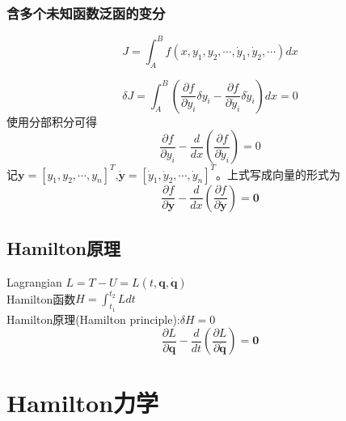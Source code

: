 \documentclass[12pt]{article}
\numberwithin{equation}{section}
\begin{document}
        \subsubsection{含多个未知函数泛函的变分}
        \begin{equation}
            J=\int_A^Bf(x,y_1,y_2,\cdots,\dot{y}_1,\dot{y}_2,\cdots)dx
        \end{equation}

        \begin{equation*}
            \delta J=\int_A^B\left(\frac{\partial f}{\partial y_i}\delta y_i-\frac{\partial f}{\partial \dot{y}_i}\delta \dot{y}_i\right)dx=0
        \end{equation*}
        使用分部积分可得
        \begin{equation}\label{mE-L}
            \frac{\partial f}{\partial y_i}-\frac{d}{dx}\left(\frac{\partial f}{\partial \dot{y}_i}\right)=0
        \end{equation}
        记$\mathbf{y}=[y_1,y_2,\cdots,y_n]^T$,$\dot{\mathbf{y}}=[\dot{y}_1,\dot{y}_2,\cdots,\dot{y}_n]^T$。上式写成向量的形式为
        \begin{equation}\label{vE-L}
            \frac{\partial f}{\partial \mathbf{y}}-\frac{d}{dx}\left(\frac{\partial f}{\partial \dot{\mathbf{y}}}\right)=\mathbf{0}
        \end{equation}
        \subsection{Hamilton原理}
        \noindent Lagrangian $L=T-U=L(t,\mathbf{q},\dot{\mathbf{q}})$\\
        Hamilton函数$H=\int_{t_1}^{t_2}Ldt$\\
        Hamilton原理(Hamilton principle):$\delta H=0$
        \begin{equation}\label{vLagrange}
            \frac{\partial L}{\partial \mathbf{q}}-\frac{d}{dt}\left(\frac{\partial L}{\partial \dot{\mathbf{q}}}\right)=\mathbf{0}
        \end{equation}

        \section{Hamilton力学}
\end{document}
